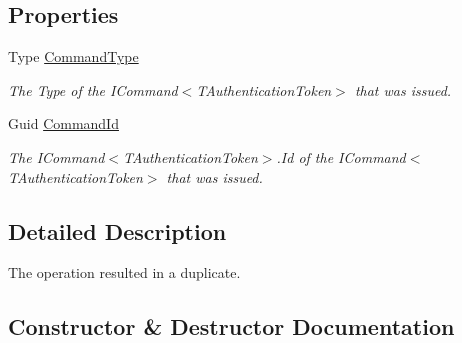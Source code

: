 \subsection*{Properties}
\begin{DoxyCompactItemize}
\item 
Type \hyperlink{classCqrs_1_1Domain_1_1Exceptions_1_1DuplicateCreateCommandException_a3c2601f354b623e415ec0b017f7a37d4_a3c2601f354b623e415ec0b017f7a37d4}{Command\+Type}
\begin{DoxyCompactList}\small\item\em The Type of the I\+Command$<$\+T\+Authentication\+Token$>$ that was issued. \end{DoxyCompactList}\item 
Guid \hyperlink{classCqrs_1_1Domain_1_1Exceptions_1_1DuplicateCreateCommandException_a9e8e94d207f21a1ae949eefa9be5095f_a9e8e94d207f21a1ae949eefa9be5095f}{Command\+Id}
\begin{DoxyCompactList}\small\item\em The I\+Command$<$\+T\+Authentication\+Token$>$.\+Id of the I\+Command$<$\+T\+Authentication\+Token$>$ that was issued. \end{DoxyCompactList}\end{DoxyCompactItemize}


\subsection{Detailed Description}
The operation resulted in a duplicate. 



\subsection{Constructor \& Destructor Documentation}
\mbox{\label{classCqrs_1_1Domain_1_1Exceptions_1_1DuplicateCreateCommandException_a0e8200ecbb5356dcb91eff89c7376784_a0e8200ecbb5356dcb91eff89c7376784}} 
